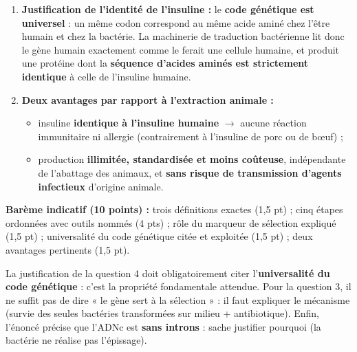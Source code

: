 \documentclass[11pt]{article}
\begin{document}
\begin{corrige}
\begin{enumerate}
\item \textbf{Justification de l'identité de l'insuline :} le \textbf{code génétique est universel} : un même codon correspond au même acide aminé chez l'être humain et chez la bactérie. La machinerie de traduction bactérienne lit donc le gène humain exactement comme le ferait une cellule humaine, et produit une protéine dont la \textbf{séquence d'acides aminés est strictement identique} à celle de l'insuline humaine.
\item \textbf{Deux avantages par rapport à l'extraction animale :}
\begin{itemize}
\item insuline \textbf{identique à l'insuline humaine} $\rightarrow$ aucune réaction immunitaire ni allergie (contrairement à l'insuline de porc ou de bœuf) ;
\item production \textbf{illimitée, standardisée et moins coûteuse}, indépendante de l'abattage des animaux, et \textbf{sans risque de transmission d'agents infectieux} d'origine animale.
\end{itemize}
\end{enumerate}
\textbf{Barème indicatif (10 points) :} trois définitions exactes (1,5 pt) ; cinq étapes ordonnées avec outils nommés (4 pts) ; rôle du marqueur de sélection expliqué (1,5 pt) ; universalité du code génétique citée et exploitée (1,5 pt) ; deux avantages pertinents (1,5 pt).
\begin{attention}
La justification de la question 4 doit obligatoirement citer l'\textbf{universalité du code génétique} : c'est la propriété fondamentale attendue. Pour la question 3, il ne suffit pas de dire « le gène sert à la sélection » : il faut expliquer le mécanisme (survie des seules bactéries transformées sur milieu + antibiotique). Enfin, l'énoncé précise que l'ADNc est \textbf{sans introns} : sache justifier pourquoi (la bactérie ne réalise pas l'épissage).
\end{attention}
\end{corrige}
\end{document}
